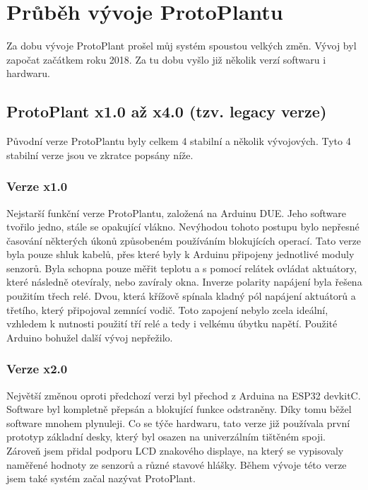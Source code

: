 \chapter{Průběh vývoje ProtoPlantu}
Za dobu vývoje ProtoPlant prošel můj systém spoustou velkých změn.
Vývoj byl započat začátkem roku 2018.
Za tu dobu vyšlo již několik verzí softwaru i hardwaru.

\section{ProtoPlant x1.0 až x4.0 (tzv. legacy verze)}
Původní verze ProtoPlantu byly celkem 4 stabilní a několik vývojových.
Tyto 4 stabilní verze jsou ve zkratce popsány níže.

\subsection{Verze x1.0}
Nejstarší funkční verze ProtoPlantu, založená na Arduinu DUE. 
Jeho software tvořilo jedno, stále se opakující vlákno.
Nevýhodou tohoto postupu bylo nepřesné časování některých úkonů způsobeném používáním blokujících operací.
Tato verze byla pouze shluk kabelů, přes které byly k Arduinu připojeny jednotlivé moduly senzorů.
Byla schopna pouze měřit teplotu a s pomocí relátek ovládat aktuátory, které následně otevíraly, nebo zavíraly okna.
Inverze polarity napájení byla řešena použitím třech relé.
Dvou, která křížově spínala kladný pól napájení aktuátorů a třetího, který připojoval zemnící vodič.
Toto zapojení nebylo zcela ideální, vzhledem k nutnosti použití tří relé a tedy i velkému úbytku napětí.
Použité Arduino bohužel další vývoj nepřežilo.

\subsection{Verze x2.0}
Největší změnou oproti předchozí verzi byl přechod z Arduina na ESP32 devkitC.
Software byl kompletně přepsán a blokující funkce odstraněny.
Díky tomu běžel software mnohem plynuleji.
Co se týče hardwaru, tato verze již používala první prototyp základní desky, který byl osazen na univerzálním tištěném spoji.
Zároveň jsem přidal podporu LCD znakového displaye, na který se vypisovaly naměřené hodnoty ze senzorů a různé stavové hlášky.
Během vývoje této verze jsem také systém začal nazývat ProtoPlant.

